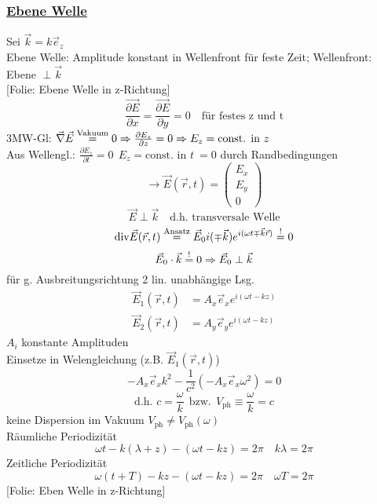 \documentclass[titlepage,12pt,a4paper,ngerman]{report}
\newcommand{\tx}[1]{\textrm{#1}}
\newcommand{\folie}[1]{\color{gray}[Folie: #1]\color{black}}
\begin{document}
\subsubsection{\underline{Ebene Welle}}
Sei $  \vec{k} = k \vec{e}_z $\\
Ebene Welle: Amplitude konstant in Wellenfront für feste Zeit; Wellenfront: Ebene $ \perp \vec{k}$\\
\folie{Ebene Welle in z-Richtung}\\
$$\frac{\vec{\partial E}}{\partial x} = \frac{\vec{\partial E}}{\partial y} = 0 \quad \tx{für festes z und t}$$
3MW-Gl: $ \vec{\nabla} \vec{E} \buildrel \tx{Vakuum} \over = 0 \Rightarrow \frac{\partial E_z}{\partial z} = 0 \Rightarrow E_z = \tx{const. in }z $\\
Aus Wellengl.: $ \frac{\partial E_z}{\partial t} = 0 \ \ E_z = \tx{const. in }t \ = 0 $ durch Randbedingungen
$$\rightarrow\vec{E} (\vec{r},t) = \begin{pmatrix}
E_x \\ E_y \\ 0
\end{pmatrix}$$
$$\vec{E} \perp \vec{k} \quad \tx{d.h. transversale Welle}$$
$$\tx{div} \vec{E} (\vec{r},t) \buildrel \tx{Ansatz} \over = \vec{E}_0 i ( \mp \vec{k}) e ^{i(\omega t \mp \vec{k} \vec{r})} \buildrel ! \over = 0$$
$$\vec{E}_0 \cdot \vec{k} \buildrel ! \over = 0 \Rightarrow \vec{E}_0 \perp \vec{k}$$
für g. Ausbreitungsrichtung 2 lin. unabhängige Lsg.
\begin{align*}
\vec{E}_1 (\vec{r},t) &= A_x \vec{e}_x e^{i(\omega t - kz)}\\
\vec{E}_2 (\vec{r},t) &= A_y \vec{e}_y e^{i(\omega t - kz)}
\end{align*}
$ A_i $ konstante Amplituden\\[5pt]
Einsetze in Welengleichung (z.B. $ \vec{E}_1(\vec{r},t) $)
$$-A_x \vec{e}_x k^2 - \frac{1}{c^2} (-A_x \vec{e}_x \omega^2) = 0$$
$$\tx{d.h. } c = \frac{\omega}{k} \ \ \tx{bzw.} \ \ V_{\tx{ph}} \equiv \frac{\omega}{k} = c$$
keine Dispersion im Vakuum $ V _{\tx{ph}} \neq V _{\tx{ph}}(\omega) $\\[5pt]
Räumliche Periodizität
$$\omega t - k(\lambda + z) - (\omega t - k z) = 2 \pi \quad k \lambda = 2 \pi$$
Zeitliche Periodizität
$$ \omega(t+T) - kz - (\omega t - kz) = 2 \pi \quad \omega T = 2 \pi$$
\folie{Eben Welle in z-Richtung}
\end{document}
